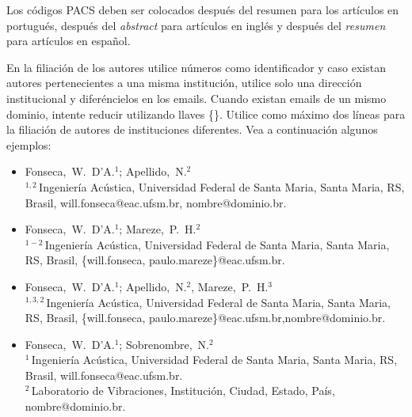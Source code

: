 \documentclass[12pt, a4paper, twoside, twocolumn]{article}
\begin{document}
Los códigos PACS deben ser colocados después del resumen para los artículos en portugués, después del \textit{abstract} para artículos en inglés y después del \textit{resumen} para artículos en español.

En la filiación de los autores utilice números como identificador y caso existan autores pertenecientes a una misma institución, utilice solo una dirección institucional y diferéncielos en los emails. Cuando existan emails de un mismo dominio, intente reducir utilizando llaves \{\}. Utilice como máximo dos líneas para la filiación de autores de instituciones diferentes. Vea a continuación algunos ejemplos:
%
\begin{flushleft}
\vspace{-0.5\baselineskip}
\begin{itemize}[topsep=-1ex,align=left,leftmargin=0.2cm] \itemsep=4pt

	\item Fonseca,~W.~D'A.$^1$; Apellido,~N.$^2$\\[6pt]	
	$^{1,2}$\,Ingeniería Acústica, Universidad Federal de Santa Maria, Santa Maria, RS, Brasil,\linebreak 
	 will.fonseca@eac.ufsm.br, nombre@dominio.br.
	
	\item Fonseca,~W.~D'A.$^1$; Mareze,~P.~H.$^2$\\[6pt]	
	$^{1-2}$\,Ingeniería Acústica, Universidad Federal de Santa Maria, Santa Maria, RS, Brasil,
	\{will.fonseca, paulo.mareze\}@eac.ufsm.br.
	
	\item Fonseca,~W.~D'A.$^1$; Apellido,~N.$^2$, Mareze,~P.~H.$^3$\\[6pt]	
	$^{1,3,2}$\,Ingeniería  Acústica, Universidad Federal de Santa Maria, Santa Maria, RS, Brasil,
	\{will.fonseca, paulo.mareze\}@eac.ufsm.br,\linebreak nombre@dominio.br.

	\item Fonseca,~W.~D'A.$^1$; Sobrenombre,~N.$^2$\\[6pt]	
	$^{1}$\,Ingeniería  Acústica, Universidad Federal de Santa Maria, Santa Maria, RS, Brasil,
	will.fonseca@eac.ufsm.br.\\[4pt]		
	$^2$\,Laboratorio de Vibraciones, Institución, Ciudad, Estado, País, nombre@dominio.br.	
\end{itemize}
\vspace{-0.4\baselineskip}
\end{flushleft}
\end{document}
